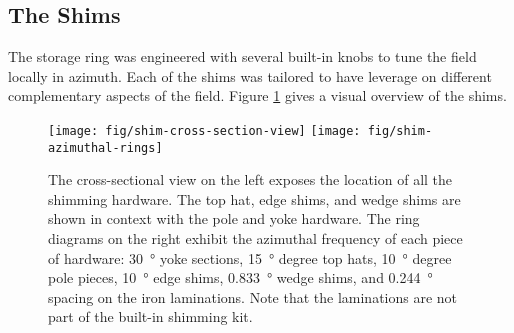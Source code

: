 


\subsection{The Shims}

The storage ring was engineered with several built-in knobs to tune the field locally in azimuth.  Each of the shims was tailored to have leverage on different complementary aspects of the field. Figure \ref{fig:shim-cross-section-view} gives a visual overview of the shims.

\begin{figure}
\centering
\texttt{[image: fig/shim-cross-section-view]}
\texttt{[image: fig/shim-azimuthal-rings]}
\caption{
    The cross-sectional view on the left exposes the location of all the shimming hardware.  The top hat, edge shims, and wedge shims are shown in context with the pole and yoke hardware.  The ring diagrams on the right exhibit the azimuthal frequency of each piece of hardware: \SI{30}{\degree} yoke sections, \SI{15}{\degree} degree top hats, \SI{10}{\degree} degree pole pieces, \SI{10}{\degree} edge shims, \SI{0.833}{\degree} wedge shims, and \SI{0.244}{\degree} spacing on the iron laminations.  Note that the laminations are not part of the built-in shimming kit. 
    \label{fig:shim-cross-section-view}
}
\end{figure}

